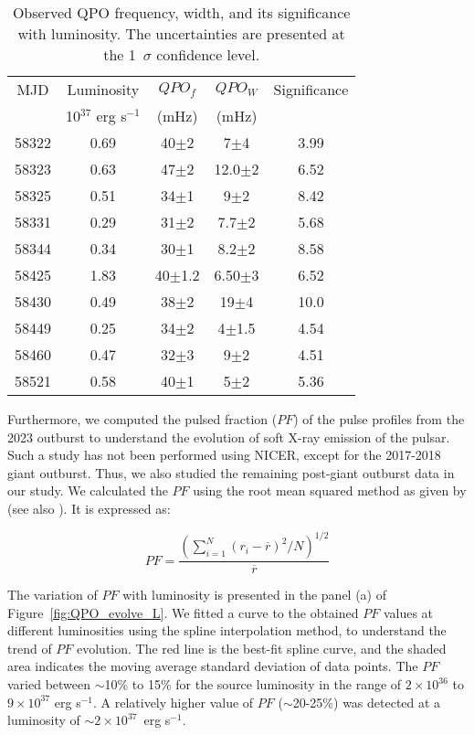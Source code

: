 \documentclass[twocolumn,trackchanges]{aastex631}
\begin{document}
\begin{table}
    \centering
    \caption{Observed QPO frequency, width, and its significance with luminosity. The uncertainties are presented at the 1~$\sigma$ confidence level.}
    \begin{tabular}{|c|c|c|c|c| }
\hline
MJD & Luminosity &  $QPO_{f}$ & $QPO_{W}$ & Significance   \\
    & 10$^{37}$ erg s$^{-1}$ & (mHz) & (mHz) &  \\
\hline
58322 & 0.69 & 40$\pm$2 & 7$\pm$4 & 3.99 \\
58323 & 0.63 & 47$\pm$2 &12.0$\pm$2& 6.52 \\ 
58325 & 0.51 & 34$\pm$1 & 9$\pm$2 & 8.42 \\ 
58331 & 0.29 & 31$\pm$2 & 7.7$\pm$2 & 5.68 \\
58344 & 0.34 & 30$\pm$1 & 8.2$\pm$2 & 8.58 \\
58425 & 1.83 & 40$\pm$1.2 &6.50$\pm$3 & 6.52 \\
58430 & 0.49 & 38$\pm$2 &19$\pm$4 & 10.0 \\
58449 & 0.25 & 34$\pm$2 & 4$\pm$1.5 & 4.54 \\
58460 & 0.47 & 32$\pm$3 &9$\pm$2 & 4.51  \\
58521 & 0.58 & 40$\pm$1 & 5$\pm$2 & 5.36 \\
\hline
    \end{tabular}
    \label{tab:QPO_significance}
\end{table}




Furthermore, we computed the pulsed fraction ($PF$) of the pulse profiles from the 2023 outburst to understand the evolution of soft X-ray emission of the pulsar. Such a study has not been performed using NICER, except for the 2017-2018 giant outburst. Thus, we also studied the remaining post-giant outburst data in our study.  We calculated the $PF$ using the root mean squared method as given by \citet{2018ApJ...863....9W} (see also \citealt{2023A&A...677A.103F}). It is expressed as: \newline

\begin{equation}
   PF = \frac{(\sum_{i=1}^{N} (r_{i}-\overline{r})^{2}/N)^{1/2}}{\overline{r}}
\end{equation}
\newline

The variation of $PF$ with luminosity is presented in the panel (a) of Figure~\ref{fig:QPO_evolve_L}.  We fitted a curve to the obtained $PF$ values at different luminosities using the spline interpolation method, to understand the trend of $PF$ evolution. The red line is the best-fit spline curve, and the shaded area indicates the moving average standard deviation of data points. The $PF$ varied between $\sim$10\% to 15\% for the source luminosity in the range of $2\times10^{36}$ to $9\times10^{37}$ erg s$^{-1}$. A relatively higher value of $PF$ ($\sim$20-25\%) was detected at a luminosity of $\sim$$2\times10^{37}$~erg s$^{-1}$. 
\end{document}
